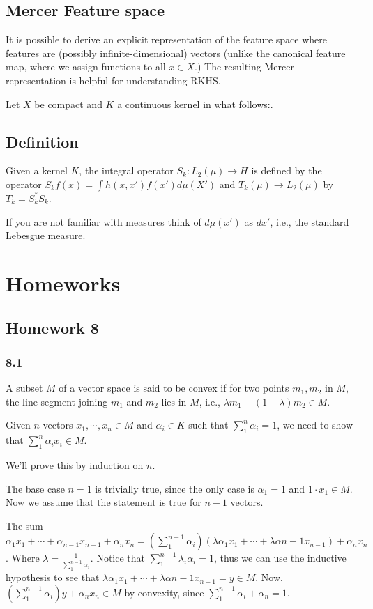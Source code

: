 \documentclass[11pt]{article}
\begin{document}
\subsection{Mercer Feature space}
\label{sec:org5355630}
It is possible to derive an explicit representation of the feature space
where features are (possibly infinite-dimensional) vectors (unlike the
canonical feature map, where we assign functions to all \(x \in X\).) The
resulting Mercer representation is helpful for understanding RKHS.

Let \(X\) be compact and \(K\) a continuous kernel in what follows:.
\subsection{Definition}
\label{sec:org06c06a1}
Given a kernel \(K\), the integral operator \(S_k \colon L_2(\mu) \rightarrow H\)
is defined by the operator \(S_k f(x) = \int h(x, x') f(x') d \mu(X')\) and
\(T_k(\mu) \rightarrow L_2(\mu)\) by \(T_k = S_k^{*} S_k\).

If you are not familiar with measures think of \(d \mu(x')\) as \(dx'\), i.e.,
the standard Lebesgue measure.
\section{Homeworks}
\label{sec:org1034d12}
\subsection{Homework 8}
\label{sec:orgf3092ad}
\subsubsection{8.1}
\label{sec:org36be941}
A subset \(M\) of a vector space is said to be convex if for two points \(m_1,
    m_2\) in \(M\), the line segment joining \(m_1\) and \(m_2\) lies in \(M\), i.e.,
\(\lambda m_1 + (1-\lambda)m_2 \in M\).

Given \(n\) vectors \(x_1, \cdots, x_n\in M\) and \(\alpha_i \in K\) such that
\(\sum_1^n \alpha_i = 1\), we need to show that \(\sum_1^n \alpha_i x_i \in M\).

We'll prove this by induction on \(n\).

The base case \(n=1\) is trivially true, since the only case is \(\alpha_1 = 1\)
and \(1\cdot x_1 \in M\). Now we assume that the statement is true for \(n-1\)
vectors.

The sum \(\alpha_1x_1 + \cdots + \alpha_{n-1}x_{n-1} + \alpha_nx_n=
    (\sum_1^{n-1}\alpha_i)(\lambda\alpha_1 x_1 + \cdots +
    \lambda\alpha{n-1}x_{n-1}) + \alpha_n x_n\). Where \(\lambda =
    \frac{1}{\sum_1^{n-1} \alpha_i}\). Notice that \(\sum_1^{n-1} \lambda_i
    \alpha_i = 1\), thus we can use the inductive hypothesis to see that
\(\lambda\alpha_1 x_1 + \cdots + \lambda\alpha{n-1}x_{n-1} = y \in M\). Now,
\((\sum_1^{n-1}\alpha_i)y + \alpha_n x_n \in M\) by convexity, since
\(\sum_1^{n-1}\alpha_i + \alpha_n = 1\).
\end{document}
